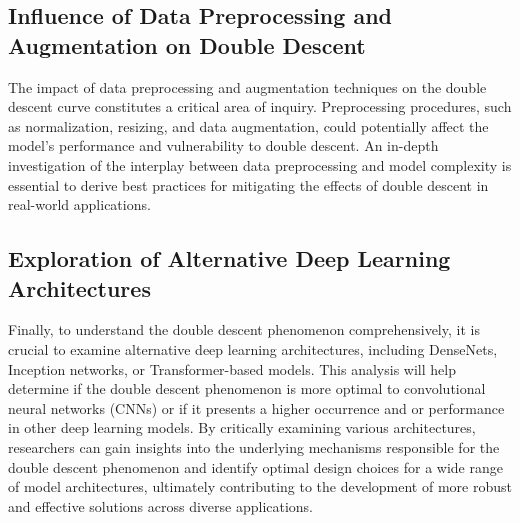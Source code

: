 \subsection{Influence of Data Preprocessing and Augmentation on Double Descent}
The impact of data preprocessing and augmentation techniques on the double descent curve constitutes a critical area of inquiry. Preprocessing procedures, such as normalization, resizing, and data augmentation, could potentially affect the model's performance and vulnerability to double descent. An in-depth investigation of the interplay between data preprocessing and model complexity is essential to derive best practices for mitigating the effects of double descent in real-world applications.

\subsection{Exploration of Alternative Deep Learning Architectures}
Finally, to understand the double descent phenomenon comprehensively, it is crucial to examine alternative deep learning architectures, including DenseNets, Inception networks, or Transformer-based models. This analysis will help determine if the double descent phenomenon is more optimal to convolutional neural networks (CNNs) or if it presents a higher occurrence and or performance in other deep learning models. By critically examining various architectures, researchers can gain insights into the underlying mechanisms responsible for the double descent phenomenon and identify optimal design choices for a wide range of model architectures, ultimately contributing to the development of more robust and effective solutions across diverse applications.